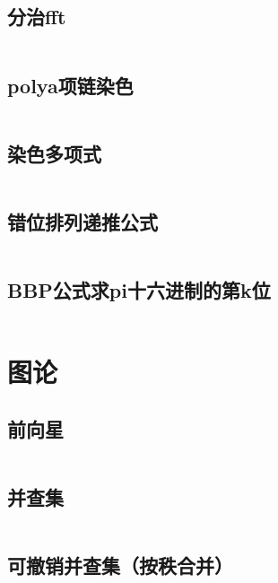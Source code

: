 \inputminted{cpp}{code/fwt.cc}

\subsection{分治fft} 

\inputminted{cpp}{code/CDQfft.cc}

\subsection{polya项链染色} 

\inputminted{cpp}{code/polya_necklace.cc}

\subsection{染色多项式} 

\inputminted{text}{code/colorPolynomial.txt}

\subsection{错位排列递推公式} 

\inputminted{cpp}{code/derangements.cc}

\subsection{BBP公式求pi十六进制的第k位} 

\inputminted{cpp}{code/BBP.cc}

\newpage\section{图论} 
\subsection{前向星} 

\inputminted{cpp}{code/PriorStar.cc}

\subsection{并查集} 

\inputminted{text}{code/union-find.cc }

\subsection{可撤销并查集（按秩合并）} 

